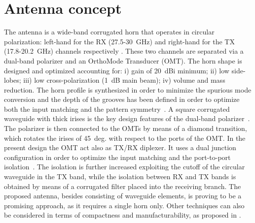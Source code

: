 \documentclass[conference,10pt,a4paper]{IEEEtran}%
\begin{document}
\section{Antenna concept}
\label{sec:ant-des}
The antenna is a wide-band corrugated horn that operates in circular polarization: left-hand for the RX (27.5-30~GHz) and right-hand for the TX (17.8-20.2~GHz) channels respectively
.
These two channels are separated via a dual-band polarizer and an OrthoMode Transducer (OMT).
The horn shape is designed and optimized accounting for: i) gain of 20~dBi minimum; ii) low side-lobes; iii) low cross-polarization (1~dB main beam); iv) volume and mass reduction.
The horn profile is synthesized in order to minimize the spurious mode conversion and the depth of the grooves has been defined in order to optimize both the input matching and the pattern symmetry~\cite{Teniente2002}.
A square corrugated waveguide with thick irises is the key design features of the dual-band polarizer~\cite{Liu2008}.
The polarizer is then connected to the OMTs by means of a diamond transition, which rotates the irises of 45~deg. with respect to the ports of the OMT.
In the present design the OMT act also as TX/RX diplexer.
It uses a dual junction configuration in order to optimize the input matching and the port-to-port isolation~\cite{DArcangelo2009}.
The isolation is further increased exploiting the cutoff of the circular waveguide in the TX band, while the isolation between RX and TX bands is obtained by means of a corrugated filter placed into the receiving branch.
The proposed antenna, besides consisting of waveguide elements, is proving to be a promising approach, as it requires a single horn only.
Other techniques can also be considered in terms of compactness and manufacturability, as proposed in \cite{Buttazzoni2017}.

\end{document}
